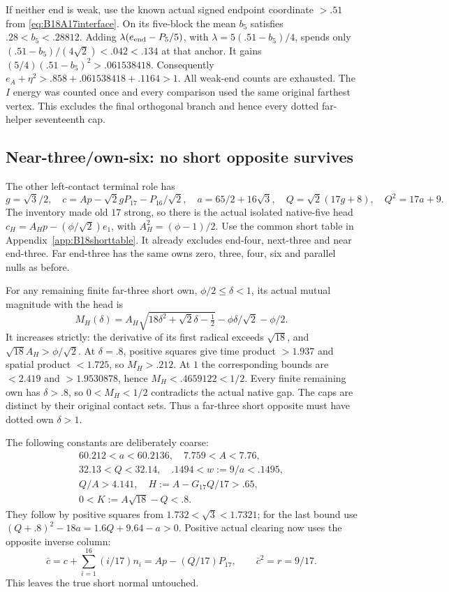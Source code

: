\documentclass[11pt]{article}
\theoremstyle{definition}
\theoremstyle{remark}
\begin{document}
If neither end is weak, use the known actual signed endpoint
coordinate \(>.51\) from \eqref{eq:B18A17interface}.
On its five-block the mean \(b_5\) satisfies \(.28<b_5<.28812\).
Adding \(\lambda(e_{\rm end}-P_5/5)\), with
\(\lambda=5(.51-b_5)/4\), spends only
\((.51-b_5)/(4\sqrt2)<.042<.134\) at that anchor.
It gains \((5/4)(.51-b_5)^2>.061538418\).
Consequently \(e_A+\eta^2>.858+.061538418+.1164>1\).
All weak-end counts are exhausted. The \(I\) energy was counted once
and every comparison used the same original farthest vertex.
This excludes the final orthogonal branch and hence every dotted
far-helper seventeenth cap.

\subsection{Near-three/own-six: no short opposite survives}
\label{app:B18near6}
The other left-contact terminal role has
\[
 g=\sqrt3/2,\quad
 c=Ap-\sqrt2gP_{17}-P_{16}/\sqrt2,\quad
 a=65/2+16\sqrt3,\quad Q=\sqrt2(17g+8),\quad Q^2=17a+9 .
\]
The inventory made old \(17\) strong, so there is the actual
isolated native-five head
\(c_H=A_Hp-(\phi/\sqrt2)e_1\), with
\(A_H^2=(\phi-1)/2\).
Use the common short table in Appendix~\ref{app:B18shorttable}.
It already excludes end-four, next-three and near end-three.
Far end-three has the same owns zero, three, four, six and parallel
nulls as before.

For any remaining finite far-three short own,
\(\phi/2\leq\delta<1\), its actual mutual magnitude with the head is
\[
 M_H(\delta)=A_H\sqrt{18\delta^2+\sqrt2\delta-\tfrac12}
             -\phi\delta/\sqrt2-\phi/2 .
\]
It increases strictly: the derivative of its first radical exceeds
\(\sqrt{18}\), and \(\sqrt{18}A_H>\phi/\sqrt2\).
At \(\delta=.8\), positive squares give time product \(>1.937\)
and spatial product \(<1.725\), so \(M_H>.212\).
At \(1\) the corresponding bounds are \(<2.419\) and
\(>1.9530878\), hence \(M_H<.4659122<1/2\).
Every finite remaining own has \(\delta>.8\), so
\(0<M_H<1/2\) contradicts the actual native gap.
The caps are distinct by their original contact sets.
Thus a far-three short opposite must have dotted own \(\delta>1\).

The following constants are deliberately coarse:
\[
\begin{gathered}
 60.212<a<60.2136,\quad 7.759<A<7.76,\\
 32.13<Q<32.14,\quad .1494<w:=9/a<.1495,\\
 Q/A>4.141,\quad H:=A-G_{17}Q/17>.65,\\
 0<K:=A\sqrt{18}-Q<.8 .
\end{gathered}
\]
They follow by positive squares from \(1.732<\sqrt3<1.7321\);
for the last bound use
\((Q+.8)^2-18a=1.6Q+9.64-a>0\).
Positive actual clearing now uses the opposite inverse column:
\[
 \bar c=c+\sum_{i=1}^{16}(i/17)n_i
       =Ap-(Q/17)P_{17},\qquad \bar c^2=r=9/17 .
\]
This leaves the true short normal untouched.
\end{document}
